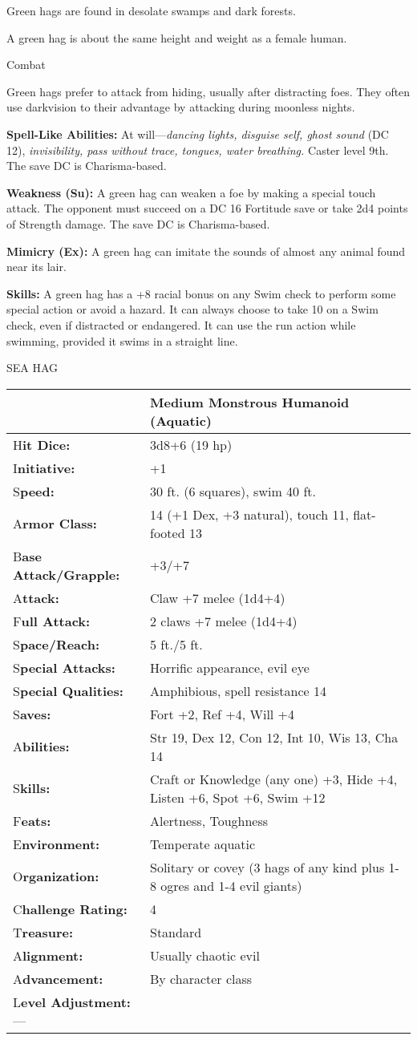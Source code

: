 \documentclass{article}
\begin{document}
Green hags are found in desolate swamps and dark forests.

A green hag is about the same height and weight as a female human.

Combat

Green hags prefer to attack from hiding, usually after distracting foes. They often 
use darkvision to their advantage by attacking during moonless nights.

\textbf{Spell-Like Abilities:} At will---\textit{dancing lights, disguise self, 
ghost sound }(DC 12), \textit{invisibility, pass without trace, tongues, water 
breathing. }Caster level 9th. The save DC is Charisma-based.

\textbf{Weakness (Su):} A green hag can weaken a foe by making a special touch 
attack. The opponent must succeed on a DC 16 Fortitude save or take 2d4 points 
of Strength damage. The save DC is Charisma-based.

\textbf{Mimicry (Ex):} A green hag can imitate the sounds of almost any animal 
found near its lair.

\textbf{Skills:} A green hag has a +8 racial bonus on any Swim check to perform 
some special action or avoid a hazard. It can always choose to take 10 on a Swim 
check, even if distracted or endangered. It can use the run action while swimming, 
provided it swims in a straight line.

\vspace{12pt}
SEA HAG

\begin{tabular}{|>{\raggedright}p{77pt}|>{\raggedright}p{248pt}|}
\hline
  & Medium Monstrous Humanoid (Aquatic)\tabularnewline
\hline
H\textbf{it Dice:} & 3d8+6 (19 hp)\tabularnewline
\hline
I\textbf{nitiative:} & +1\tabularnewline
\hline
S\textbf{peed:} & 30 ft. (6 squares), swim 40 ft.\tabularnewline
\hline
A\textbf{rmor Class:} & 14 (+1 Dex, +3 natural), touch 11, flat-footed 13\tabularnewline
\hline
B\textbf{ase Attack/Grapple:} & +3/+7\tabularnewline
\hline
A\textbf{ttack:} & Claw +7 melee (1d4+4)\tabularnewline
\hline
F\textbf{ull Attack:} & 2 claws +7 melee (1d4+4)\tabularnewline
\hline
S\textbf{pace/Reach:} & 5 ft./5 ft.\tabularnewline
\hline
S\textbf{pecial Attacks:} & Horrific appearance, evil eye\tabularnewline
\hline
S\textbf{pecial Qualities:} & Amphibious, spell resistance 14\tabularnewline
\hline
S\textbf{aves:} & Fort +2, Ref +4, Will +4\tabularnewline
\hline
A\textbf{bilities:} & Str 19, Dex 12, Con 12, Int 10, Wis 13, Cha 14\tabularnewline
\hline
S\textbf{kills:} & Craft or Knowledge (any one) +3, Hide +4, Listen +6, Spot +6, 
Swim +12\tabularnewline
\hline
F\textbf{eats:} & Alertness, Toughness\tabularnewline
\hline
E\textbf{nvironment:} & Temperate aquatic\tabularnewline
\hline
O\textbf{rganization:} & Solitary or covey (3 hags of any kind plus 1-8 ogres and 
1-4 evil giants)\tabularnewline
\hline
C\textbf{hallenge Rating:} & 4\tabularnewline
\hline
T\textbf{reasure:} & Standard\tabularnewline
\hline
A\textbf{lignment:} & Usually chaotic evil\tabularnewline
\hline
A\textbf{dvancement:} & By character class\tabularnewline
\hline
L\textbf{evel Adjustment:}--- & \tabularnewline
\hline
\end{tabular}
\end{document}
